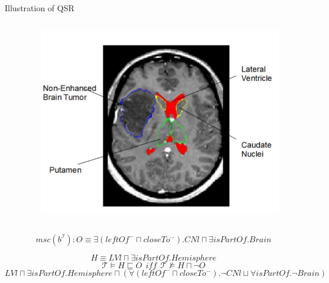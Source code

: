 \documentclass{beamer}
\begin{document}
\begin{frame}{Illustration of QSR}
\begin{columns}
 \begin{column}{.5\textwidth}
   \centering
{}
 \end{column}
 \begin{column}{.5\textwidth}
  	\begin{figure}
	\includegraphics[width=.5\textwidth]{images/cerebrale.png}
	\end{figure}
 \end{column}
\end{columns}

\begin{exampleblock}{}
$$msc(b^\mathcal{I}):O\equiv \exists (leftOf^-\sqcap closeTo^-). CNl\sqcap \exists isPartOf.Brain$$
\end{exampleblock}
\begin{exampleblock}{}
$$H\equiv LVl\sqcap \exists isPartOf.Hemisphere$$
 $$ \mathcal{T}\vDash H\sqsubseteq O ~~iff~~ \mathcal{T}\nvDash H\sqcap \neg O $$
 $$LVl\sqcap \exists isPartOf.Hemisphere\sqcap( \forall (leftOf^-\sqcap closeTo^-).\neg CNl\sqcup \forall isPartOf.\neg Brain)$$
\end{exampleblock}


\end{frame}
\end{document}

